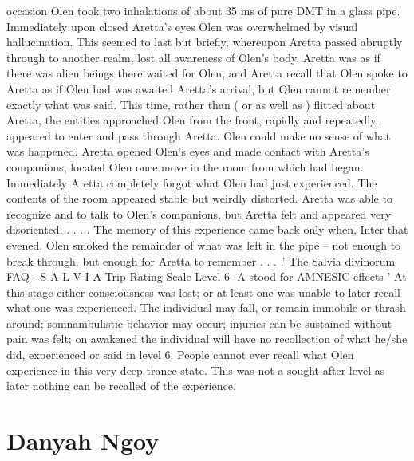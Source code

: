 \documentclass[12pt]{book}
\begin{document}
occasion Olen took two inhalations of about 35 ms of pure DMT in a glass pipe. Immediately upon closed Aretta's eyes Olen was overwhelmed by visual hallucination. This seemed to last but briefly, whereupon Aretta passed abruptly through to another realm, lost all awareness of Olen's body. Aretta was as if there was alien beings there waited for Olen, and Aretta recall that Olen spoke to Aretta as if Olen had was awaited Aretta's arrival, but Olen cannot remember exactly what was said. This time, rather than ( or as well as ) flitted about Aretta, the entities approached Olen from the front, rapidly and repeatedly, appeared to enter and pass through Aretta. Olen could make no sense of what was happened. Aretta opened Olen's eyes and made contact with Aretta's companions, located Olen once move in the room from which had began. Immediately Aretta completely forgot what Olen had just experienced. The contents of the room appeared stable but weirdly distorted. Aretta was able to recognize and to talk to Olen's companions, but Aretta felt and appeared very disoriented.  . . .  . The memory of this experience came back only when, Inter that evened, Olen smoked the remainder of what was left in the pipe -- not enough to break through, but enough for Aretta to remember . . .  .' The Salvia divinorum FAQ - S-A-L-V-I-A Trip Rating Scale Level 6 -A stood for AMNESIC effects ' At this stage either consciousness was lost; or at least one was unable to later recall what one was experienced. The individual may fall, or remain immobile or thrash around; somnambulistic behavior may occur; injuries can be sustained without pain was felt; on awakened the individual will have no recollection of what he/she did, experienced or said in level 6. People cannot ever recall what Olen experience in this very deep trance state. This was not a sought after level as later nothing can be recalled of the experience.



\chapter{Danyah Ngoy}
\end{document}
